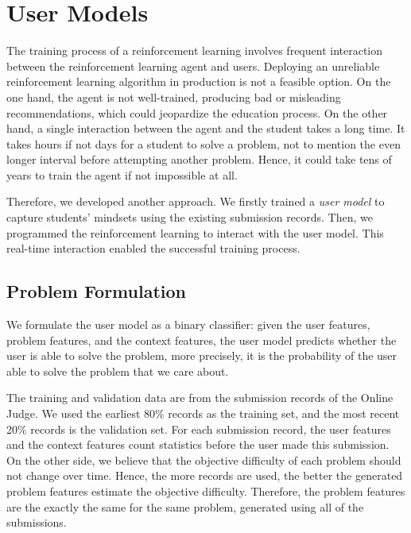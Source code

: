 
\chapter{User Models}

    The training process of a reinforcement learning involves frequent interaction
    between the reinforcement learning agent and users.
    Deploying an unreliable reinforcement learning algorithm in production is not a feasible option.
    On the one hand, the agent is not well-trained, producing bad or misleading recommendations,
    which could jeopardize the education process.
    On the other hand, a single interaction between the agent and the student takes a long time.
    It takes hours if not days for a student to solve a problem,
    not to mention the even longer interval before attempting another problem.
    Hence, it could take tens of years to train the agent if not impossible at all.

    Therefore, we developed another approach.
    We firstly trained a \emph{user model} to capture students' mindsets using the existing submission records.
    Then, we programmed the reinforcement learning to interact with the user model.
    This real-time interaction enabled the successful training process.

\section{Problem Formulation}

    We formulate the user model as a binary classifier:
    given the user features, problem features, and the context features,
    the user model predicts whether the user is able to solve the problem,
    more precisely,
    it is the probability of the user able to solve the problem that we care about.

    The training and validation data are from the submission records of the Online Judge.
    We used the earliest 80\% records as the training set,
    and the most recent 20\% records is the validation set.
    For each submission record, the user features and the context features
    count statistics before the user made this submission.
    On the other side, we believe that the objective difficulty of each problem should not change over time.
    Hence, the more records are used, the better the generated problem features estimate the objective difficulty.
    Therefore, the problem features are the exactly the same for the same problem,
    generated using all of the submissions.


